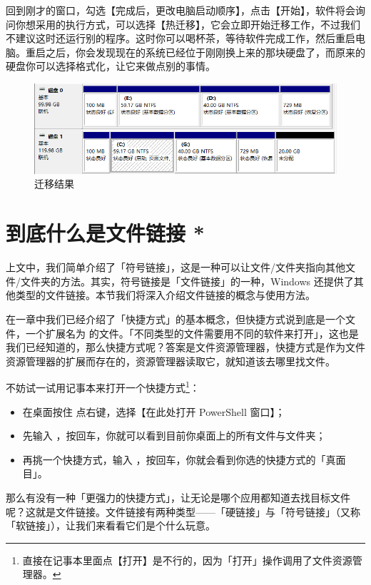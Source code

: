 {{{回到刚才的窗口，勾选【完成后，更改电脑启动顺序】，点击【开始】，软件将会询问你想采用的执行方式，可以选择【热迁移】，它会立即开始迁移工作，不过我们不建议这时还运行别的程序。这时你可以喝杯茶，等待软件完成工作，然后重启电脑。重启之后，你会发现现在的系统已经位于刚刚换上来的那块硬盘了，而原来的硬盘你可以选择格式化，让它来做点别的事情。

\begin{figure}[htb!]
  \centering
  \includegraphics[width=.75\textwidth]{assets/advanced/Migration_Result.png}
  \caption{迁移结果}
  \label{fig:Migration_Result}
\end{figure}

\section{到底什么是文件链接 *}

上文中，我们简单介绍了「符号链接」，这是一种可以让文件/文件夹指向其他文件/文件夹的方法。其实，符号链接是「文件链接」的一种，Windows 还提供了其他类型的文件链接。本节我们将深入介绍文件链接的概念与使用方法。

在一章中我们已经介绍了「快捷方式」的基本概念，但快捷方式说到底是一个文件，一个扩展名为  的文件。「不同类型的文件需要用不同的软件来打开」，这也是我们已经知道的，那么快捷方式呢？答案是文件资源管理器，快捷方式是作为文件资源管理器的扩展而存在的，资源管理器读取它，就知道该去哪里找文件。

不妨试一试用记事本来打开一个快捷方式\footnote{直接在记事本里面点【打开】是不行的，因为「打开」操作调用了文件资源管理器。}：

\begin{itemize}
  \item 在桌面按住  点右键，选择【在此处打开 PowerShell 窗口】；
  \item 先输入 ，按回车，你就可以看到目前你桌面上的所有文件与文件夹；
  \item 再挑一个快捷方式，输入 ，按回车，你就会看到你选的快捷方式的「真面目」。
\end{itemize}

那么有没有一种「更强力的快捷方式」，让无论是哪个应用都知道去找目标文件呢？这就是文件链接。文件链接有两种类型——「硬链接」与「符号链接」（又称「软链接」），让我们来看看它们是个什么玩意。

}}}

